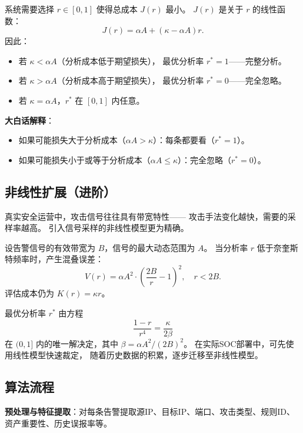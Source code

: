 \documentclass[11pt,a4paper]{article}
\begin{document}
系统需要选择 $r \in [0,1]$ 使得总成本 $J(r)$ 最小。
$J(r)$ 是关于 $r$ 的线性函数：
\[
J(r) = \alpha A + (\kappa - \alpha A) r.
\]
因此：
\begin{itemize}
    \item 若 $\kappa < \alpha A$（分析成本低于期望损失），
          最优分析率 $r^* = 1$——完整分析。
    \item 若 $\kappa > \alpha A$（分析成本高于期望损失），
          最优分析率 $r^* = 0$——完全忽略。
    \item 若 $\kappa = \alpha A$，$r^*$ 在 $[0,1]$ 内任意。
\end{itemize}

\textbf{大白话解释}：
\begin{itemize}
    \item 如果可能损失大于分析成本（$\alpha A > \kappa$）：每条都要看（$r^*=1$）。
    \item 如果可能损失小于或等于分析成本（$\alpha A \le \kappa$）：完全忽略（$r^*=0$）。
\end{itemize}

\subsection{非线性扩展（进阶）}

真实安全运营中，攻击信号往往具有带宽特性——
攻击手法变化越快，需要的采样率越高。
引入信号采样的非线性模型更为精确。

设告警信号的有效带宽为 $B$，信号的最大动态范围为 $A$。
当分析率 $r$ 低于奈奎斯特频率时，产生混叠误差：
\begin{equation}\label{eq:V_nonlinear}
V(r) = \alpha A^2 \cdot \left( \frac{2B}{r} - 1 \right)^2, \quad r < 2B.
\end{equation}
评估成本仍为 $K(r) = \kappa r$。

最优分析率 $r^*$ 由方程
\begin{equation}\label{eq:optimal_r}
\frac{1-r}{r^4} = \frac{\kappa}{2\beta}
\end{equation}
在 $(0, 1]$ 内的唯一解决定，其中 $\beta = \alpha A^2 / (2B)^2$。
在实际SOC部署中，可先使用线性模型快速裁定，
随着历史数据的积累，逐步迁移至非线性模型。

\subsection{算法流程}

\textbf{预处理与特征提取}：对每条告警提取源IP、目标IP、端口、攻击类型、规则ID、资产重要性、历史误报率等。
\end{document}
